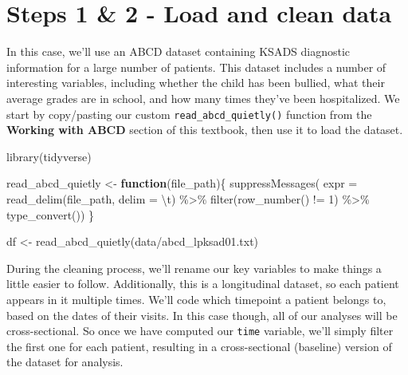 \documentclass[
]{book}
\newenvironment{Shaded}{\begin{snugshade}}{\end{snugshade}}
\newcommand{\AttributeTok}[1]{\textcolor[rgb]{0.77,0.63,0.00}{#1}}
\newcommand{\ControlFlowTok}[1]{\textcolor[rgb]{0.13,0.29,0.53}{\textbf{#1}}}
\newcommand{\DecValTok}[1]{\textcolor[rgb]{0.00,0.00,0.81}{#1}}
\newcommand{\FunctionTok}[1]{\textcolor[rgb]{0.00,0.00,0.00}{#1}}
\newcommand{\NormalTok}[1]{#1}
\newcommand{\OtherTok}[1]{\textcolor[rgb]{0.56,0.35,0.01}{#1}}
\newcommand{\SpecialCharTok}[1]{\textcolor[rgb]{0.00,0.00,0.00}{#1}}
\newcommand{\StringTok}[1]{\textcolor[rgb]{0.31,0.60,0.02}{#1}}
\begin{document}
\hypertarget{steps-1-2---load-and-clean-data}{%
\section{Steps 1 \& 2 - Load and clean data}\label{steps-1-2---load-and-clean-data}}

In this case, we'll use an ABCD dataset containing KSADS diagnostic information for a large number of patients. This dataset includes a number of interesting variables, including whether the child has been bullied, what their average grades are in school, and how many times they've been hospitalized. We start by copy/pasting our custom \texttt{read\_abcd\_quietly()} function from the \textbf{Working with ABCD} section of this textbook, then use it to load the dataset.

\begin{Shaded}
\begin{Highlighting}[]
\FunctionTok{library}\NormalTok{(tidyverse)}

\NormalTok{read\_abcd\_quietly }\OtherTok{\textless{}{-}} \ControlFlowTok{function}\NormalTok{(file\_path)\{}
  \FunctionTok{suppressMessages}\NormalTok{(}
    \AttributeTok{expr =} \FunctionTok{read\_delim}\NormalTok{(file\_path, }\AttributeTok{delim =} \StringTok{\textquotesingle{}}\SpecialCharTok{\textbackslash{}t}\StringTok{\textquotesingle{}}\NormalTok{) }\SpecialCharTok{\%\textgreater{}\%} 
      \FunctionTok{filter}\NormalTok{(}\FunctionTok{row\_number}\NormalTok{() }\SpecialCharTok{!=} \DecValTok{1}\NormalTok{) }\SpecialCharTok{\%\textgreater{}\%} 
      \FunctionTok{type\_convert}\NormalTok{())}
\NormalTok{\}}

\NormalTok{df }\OtherTok{\textless{}{-}} \FunctionTok{read\_abcd\_quietly}\NormalTok{(}\StringTok{\textquotesingle{}data/abcd\_lpksad01.txt\textquotesingle{}}\NormalTok{)}
\end{Highlighting}
\end{Shaded}

During the cleaning process, we'll rename our key variables to make things a little easier to follow. Additionally, this is a longitudinal dataset, so each patient appears in it multiple times. We'll code which timepoint a patient belongs to, based on the dates of their visits. In this case though, all of our analyses will be cross-sectional. So once we have computed our \texttt{time} variable, we'll simply filter the first one for each patient, resulting in a cross-sectional (baseline) version of the dataset for analysis.
\end{document}
